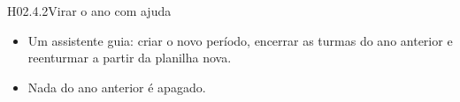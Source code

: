 \begin{historia}{H02.4.2}{Virar o ano com ajuda}{\afazer}
\aceiteproposta
\begin{itemize}
  \item Um assistente guia: criar o novo período, encerrar as turmas do ano
    anterior e reenturmar a partir da planilha nova.
  \item Nada do ano anterior é apagado.
\end{itemize}
\end{historia}
